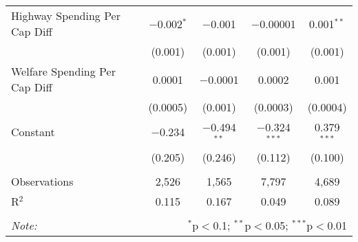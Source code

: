 \begin{table}[!htbp]
\begin{tabular}{@{\extracolsep{5pt}}lcccc}
  Highway Spending Per Cap Diff & $-$0.002$^{*}$ & $-$0.001 & $-$0.00001 & 0.001$^{**}$ \\ 
  & (0.001) & (0.001) & (0.001) & (0.001) \\ 
  Welfare Spending Per Cap Diff & 0.0001 & $-$0.0001 & 0.0002 & 0.001 \\ 
  & (0.0005) & (0.001) & (0.0003) & (0.0004) \\ 
  Constant & $-$0.234 & $-$0.494$^{**}$ & $-$0.324$^{***}$ & 0.379$^{***}$ \\ 
  & (0.205) & (0.246) & (0.112) & (0.100) \\ 
 \hline \\[-1.8ex] 
Observations & 2,526 & 1,565 & 7,797 & 4,689 \\ 
R$^{2}$ & 0.115 & 0.167 & 0.049 & 0.089 \\ 
\hline 
\hline \\[-1.8ex] 
\textit{Note:}  & \multicolumn{4}{r}{$^{*}$p$<$0.1; $^{**}$p$<$0.05; $^{***}$p$<$0.01} \\ 
\end{tabular} 
\end{table} 
